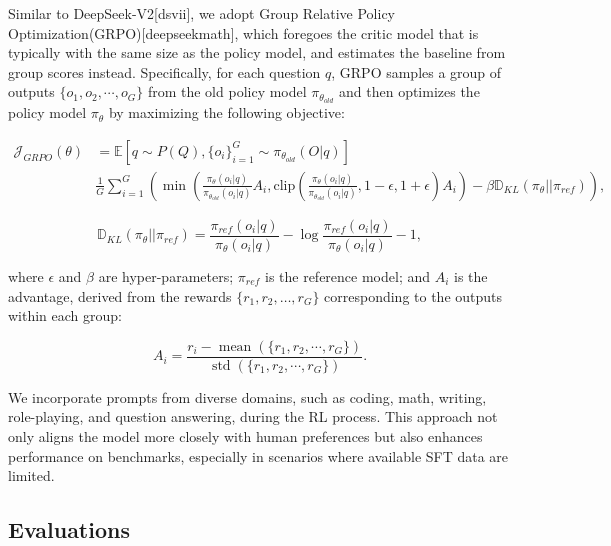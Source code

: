 \documentclass[11pt,a4paper]{article}
\begin{document}
Similar to DeepSeek-V2[dsvii], we adopt Group Relative Policy Optimization(GRPO)[deepseekmath], which foregoes the critic model that is typically with the same size as the policy model, and estimates the baseline from group scores instead. Specifically, for each question $q$, GRPO samples a group of outputs $\{o_1, o_2, \cdots, o_G\}$ from the old policy model $\pi_{\theta_{old}}$ and then optimizes the policy model $\pi_{\theta}$ by maximizing the following objective:

$$\begin{equation}
\begin{split}
    \mathcal{J}_{GRPO}(\theta) &= \mathbb{E}{[q \sim P(Q), \{o_i\}_{i=1}^G \sim \pi_{\theta_{old}}(O|q)]}  \\
    & \frac{1}{G}\sum_{i=1}^G \left( \min \left( \frac{\pi_\theta(o_i |q)}{\pi_{\theta_{old}}(o_i |q)} A_i, \text{clip} \left( \frac{\pi_\theta(o_i |q)}{\pi_{\theta_{old}}(o_i |q)}, 1 - \epsilon, 1 + \epsilon \right)  A_i \right) - \beta \mathbb{D}_{KL}\left(\pi_{\theta} || \pi_{ref}\right)\right) ,
\end{split}

\end{equation}$$

$$\begin{equation}
    \mathbb{D}_{KL}\left(\pi_{\theta} || \pi_{ref}\right) = \frac{\pi_{ref}(o_i|q)}{\pi_{\theta}(o_i|q)}- \log\frac{\pi_{ref}(o_i|q)}{\pi_{\theta}(o_i|q)} - 1,
\end{equation}$$

where $\epsilon$ and $\beta$ are hyper-parameters; $\pi_{ref}$ is the reference model; and $A_i$ is the advantage, derived from the rewards $\{r_1, r_2, \ldots, r_G\}$ corresponding to the outputs within each group:

$$\begin{equation}
    A_i = \frac{r_i - {\operatorname{mean}(\{r_1, r_2, \cdots, r_G\})}}{{\operatorname{std}(\{r_1, r_2, \cdots, r_G\})}}.
\end{equation}$$

We incorporate prompts from diverse domains, such as coding, math, writing, role-playing, and question answering, during the RL process. This approach not only aligns the model more closely with human preferences but also enhances performance on benchmarks, especially in scenarios where available SFT data are limited.

\subsection{Evaluations}
\end{document}
